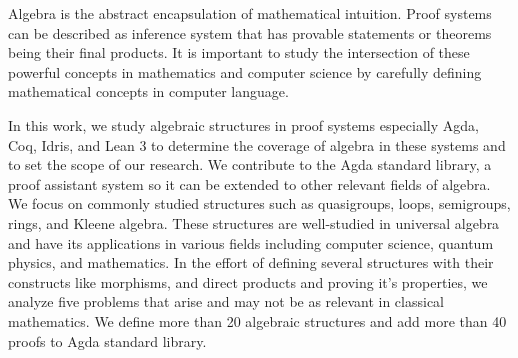 Algebra is the abstract encapsulation of mathematical intuition. Proof systems
can be described as inference system that has provable statements or theorems
being their final products. It is important to study the intersection of these
powerful concepts in mathematics and computer science by carefully defining
mathematical concepts in computer language.

In this work, we study algebraic structures in proof systems especially Agda,
Coq, Idris, and Lean 3 to determine the coverage of algebra in these systems and
to set the scope of our research. We contribute to the Agda standard library, a
proof assistant system so it can be extended to other relevant fields of
algebra. We focus on commonly studied structures such as quasigroups, loops,
semigroups, rings, and Kleene algebra. These structures are well-studied in
universal algebra and have its applications in various fields including computer
science, quantum physics, and mathematics. In the effort of defining several
structures with their constructs like morphisms, and direct products and proving
it's properties, we analyze five problems that arise and may not be as relevant
in classical mathematics. We define more than 20 algebraic structures and add
more than 40 proofs to Agda standard library.